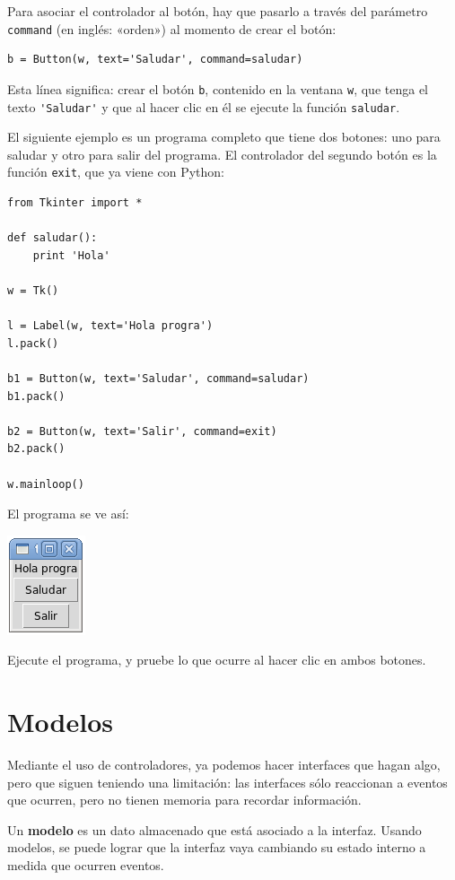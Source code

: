 Para asociar el controlador al botón, hay que pasarlo a través del
parámetro \lstinline!command! (en inglés: «orden») al momento de crear
el botón:
\begin{lstlisting}
b = Button(w, text='Saludar', command=saludar)
\end{lstlisting}

Esta línea significa: crear el botón \lstinline!b!, contenido en la
ventana \lstinline!w!, que tenga el texto \lstinline!'Saludar'! y que al
hacer clic en él se ejecute la función \lstinline!saludar!.

El siguiente ejemplo es un programa completo que tiene dos botones: uno
para saludar y otro para salir del programa. El controlador del segundo
botón es la función \lstinline!exit!, que ya viene con Python:

\begin{lstlisting}
from Tkinter import *

def saludar():
    print 'Hola'

w = Tk()

l = Label(w, text='Hola progra')
l.pack()

b1 = Button(w, text='Saludar', command=saludar)
b1.pack()

b2 = Button(w, text='Salir', command=exit)
b2.pack()

w.mainloop()
\end{lstlisting}

El programa se ve así:

\includegraphics{../diapos/programas/tkinter/capturas/04.png}

Ejecute el programa, y pruebe lo que ocurre al hacer clic en ambos
botones.

\section{Modelos}

Mediante el uso de controladores, ya podemos hacer interfaces que hagan
algo, pero que siguen teniendo una limitación: las interfaces sólo
reaccionan a eventos que ocurren, pero no tienen memoria para recordar
información.

Un \textbf{modelo} es un dato almacenado que está asociado a la
interfaz. Usando modelos, se puede lograr que la interfaz vaya cambiando
su estado interno a medida que ocurren eventos.

